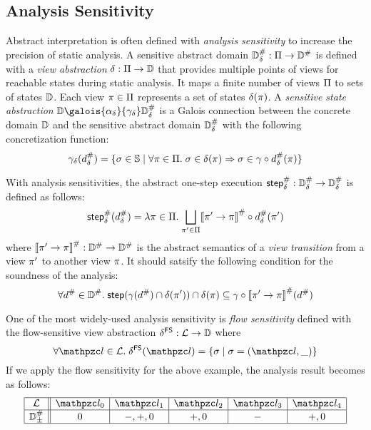\subsection{Analysis Sensitivity}

Abstract interpretation is often defined with \textit{analysis sensitivity} to
increase the precision of static analysis.  A sensitive abstract domain
${\mathbb{D}}^{\#}_\delta: \Pi \rightarrow {\mathbb{D}}^{\#}$ is defined with a \textit{view
abstraction} $\delta: \Pi \rightarrow \mathbb{D}$ that provides multiple points
of views for reachable states during static analysis.  It maps a finite number
of views $\Pi$ to sets of states $\mathbb{D}$. Each view $\pi \in \Pi$
represents a set of states $\delta(\pi)$.
A \textit{sensitive state abstraction} $\dom
\galois{\alpha_\viewmap}{\gamma_\viewmap} \sabsdom$ is a Galois connection between
the concrete domain $\mathbb{D}$ and the sensitive abstract domain ${\mathbb{D}}^{\#}_\delta$ with the
following concretization function:
\[
  \gamma_\delta({d}^{\#}_\delta) = \{ \sigma \in \mathbb{S} \mid \forall \pi \in \Pi.
  \; \sigma \in \delta(\pi) \Rightarrow \sigma \in \gamma \circ {d}^{\#}_\delta(\pi) \}
\]

With analysis sensitivities, the abstract one-step execution ${\textsf{step}}^{\#}_\delta:
{\mathbb{D}}^{\#}_\delta \rightarrow {\mathbb{D}}^{\#}_\delta$ is defined as follows:
\[
  {\textsf{step}}^{\#}_\delta({d}^{\#}_\delta) = \lambda \pi \in \Pi. \; \underset{\pi' \in
  \Pi}{\bigsqcup}{{[\![{\pi' \rightarrow \pi}]\!]}^{\#} \circ {d}^{\#}_\delta(\pi')}
\]
where ${[\![{\pi' \rightarrow \pi}]\!]}^{\#}: {\mathbb{D}}^{\#} \rightarrow {\mathbb{D}}^{\#}$ is the abstract
semantics of a \textit{view transition} from a view $\pi'$ to another view
$\pi$.  It should satsify the following condition for the soundness of the
analysis:
\[
  \forall {d}^{\#} \in {\mathbb{D}}^{\#}. \; \textsf{step}(\gamma({d}^{\#}) \cap \delta(\pi'))
  \cap \delta(\pi) \subseteq \gamma \circ
  {[\![{\pi' \rightarrow \pi}]\!]}^{\#}({d}^{\#})
\]

One of the most widely-used analysis sensitivity is \textit{flow sensitivity}
defined with the flow-sensitive view abstraction $\delta^{\textsf{FS}}: \mathcal{L}
\rightarrow \mathbb{D}$ where
\[
  \forall \lab\in\labset. \; \fsviewmap(\lab) = \{ \st \mid \st = (\lab, \_) \}
\]
If we apply the flow sensitivity for the above example, the analysis result
becomes as follows:
\[
  \begin{array}{|c||c|c|c|c|c|}\hline
    \labset & \lab_0 & \lab_1 & \lab_2 & \lab_3 & \lab_4\\\hline
    \absdom_\pm & 0 & -, +, 0 & +, 0 & - & +, 0\\\hline
  \end{array}
\]


